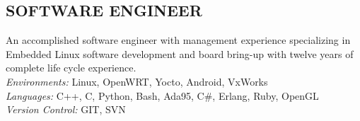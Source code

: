 \documentclass[line]{res}
\begin{document}
\address{San Mateo, CA}
\address{mathew.prokos@gmail.com}

\begin{resume}
\section{SOFTWARE ENGINEER}
    \vspace{1mm}
    An accomplished software engineer with management experience specializing in Embedded Linux software
development and board bring-up with twelve years of complete life cycle experience.\\

    \vspace{-5mm}
    {\sl Environments:} Linux, OpenWRT, Yocto, Android, VxWorks\\
    {\sl Languages:} C++, C, Python, Bash, Ada95, C\#, Erlang, Ruby, OpenGL\\
    {\sl Version Control:} GIT, SVN\\
\vspace{-5mm}

\end{resume}
\end{document}
